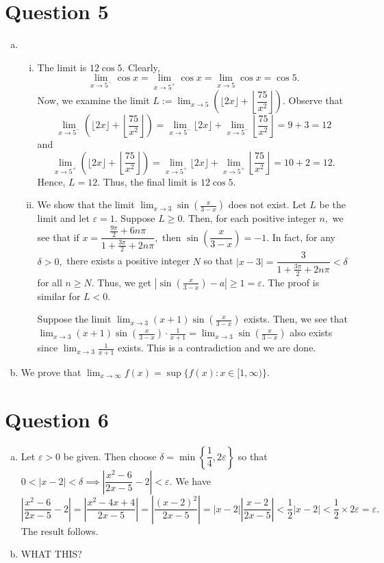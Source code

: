 \documentclass{article}
\begin{document}
\section*{Question 5}
\begin{enumerate}[(a)]
    \item \begin{enumerate}[(i)]
        \item The limit is $12\cos 5.$ Clearly, $$\lim_{x\to 5^-}\cos x=\lim_{x\to 5^+}\cos x=\lim_{x\to 5}\cos x=\cos 5.$$
        Now, we examine the limit $L:=\displaystyle\lim_{x\to 5}\left(\lfloor2x\rfloor+\left\lfloor\dfrac{75}{x^2}\right\rfloor\right).$ Observe that $$\lim_{x\to 5^-}\left(\lfloor2x\rfloor+\left\lfloor\dfrac{75}{x^2}\right\rfloor\right)=\lim_{x\to 5^-}\lfloor2x\rfloor+\lim_{x\to 5^-}\left\lfloor\dfrac{75}{x^2}\right\rfloor=9+3=12$$
        and $$\lim_{x\to 5^+}\left(\lfloor2x\rfloor+\left\lfloor\dfrac{75}{x^2}\right\rfloor\right)=\lim_{x\to 5^+}\lfloor2x\rfloor+\lim_{x\to 5^+}\left\lfloor\dfrac{75}{x^2}\right\rfloor=10+2=12.$$
        Hence, $L=12.$ Thus, the final limit is $12\cos5.$
        \item We show that the limit $\displaystyle\lim_{x\to3}\sin\left(\frac{x}{3-x}\right)$ does not exist. Let $L$ be the limit and let $\varepsilon=1$. Suppose $L\geq 0.$ Then, for each positive integer $n,$ we see that if $x=\dfrac{\frac{9\pi}{2}+6n\pi}{1+\frac{3\pi}{2}+2n\pi},$ then $\sin\left(\dfrac{x}{3-x}\right)=-1.$ In fact, for any $\delta>0,$ there exists a positive integer $N$ so that $|x-3|=\dfrac{3}{1+\frac{3\pi}{2}+2n\pi}<\delta$ for all $n\geq N.$ Thus, we get $\displaystyle\left|\sin\left(\frac{x}{3-x}\right)-a\right|\geq1=\varepsilon.$  The proof is similar for $L<0.$
        
        Suppose the limit $\displaystyle\lim_{x\to3}(x+1)\sin\left(\frac{x}{3-x}\right)$ exists. Then, we see that $\displaystyle\lim_{x\to3}(x+1)\sin\left(\frac{x}{3-x}\right)\cdot\frac{1}{x+1}=\displaystyle\lim_{x\to3}\sin\left(\frac{x}{3-x}\right)$ also exists since $\displaystyle\lim_{x\to3}\frac{1}{x+1}$ exists. This is a contradiction and we are done.
    \end{enumerate}
    \item We prove that $\displaystyle\lim_{x\to\infty}f(x)=\sup\{f(x):x\in[1,\infty)\}.$
\end{enumerate}
\section*{Question 6}
\begin{enumerate}[(a)]
        \item Let $\varepsilon>0$ be given. Then choose $\delta=\min\left\{\dfrac{1}{4},2\varepsilon\right\}$ so that $0<|x-2|<\delta\implies\left|\dfrac{x^2-6}{2x-5}-2\right|<\varepsilon.$ We have
        $$\left|\dfrac{x^2-6}{2x-5}-2\right|=\left|\frac{x^2-4x+4}{2x-5}\right|=
        \left|\frac{(x-2)^2}{2x-5}\right|=|x-2|\left|\frac{x-2}{2x-5}\right|<\frac{1}{2}|x-2|<\frac{1}{2}\times2\varepsilon=\varepsilon.$$
        The result follows.
        \item WHAT THIS?
\end{enumerate}
\end{document}
